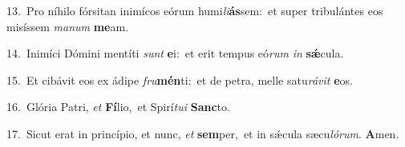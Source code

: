 {\numbfont\textcolor{\numbcolor}{13.}}~Pro níhilo fórsitan inimícos eórum humi\-\textit{li}\-\textbf{ás}sem:~\star et super tribulántes eos misíssem \textit{ma}\-\textit{num} \textbf{me}\-am.\par
{\numbfont\textcolor{\numbcolor}{14.}}~Inimíci Dómini mentíti \textit{sunt} \textbf{e}\-i:~\star et erit tempus eó\textit{rum} \textit{in} \textbf{sǽ}\-cula.\par
{\numbfont\textcolor{\numbcolor}{15.}}~Et cibávit eos ex ádipe \textit{fru}\-\textbf{mén}ti:~\star et de petra, melle satu\-\textit{rá}\-\textit{vit} \textbf{e}\-os.\par
{\numbfont\textcolor{\numbcolor}{16.}}~Glória Patri, \textit{et} \textbf{Fí}\-lio,~\star et Spirí\-\textit{tu}\-\textit{i} \textbf{Sanc}\-to.\par
{\numbfont\textcolor{\numbcolor}{17.}}~Sicut erat in princípio, et nunc, \textit{et} \textbf{sem}\-per,~\star et in sǽcula sæcu\-\textit{ló}\-\textit{rum}. \textbf{A}\-men.\par
